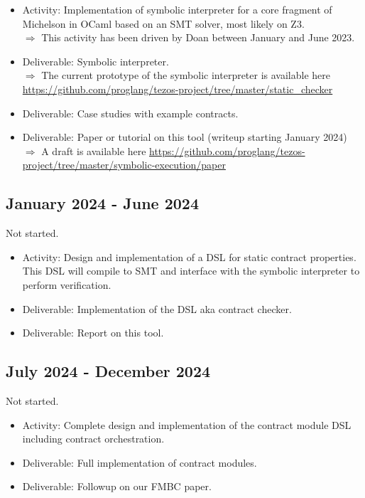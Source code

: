 \documentclass[a4paper,11pt]{article}
\begin{document}
\begin{itemize}
\item Activity: Implementation of symbolic interpreter for a core
  fragment of Michelson in OCaml based on an SMT solver, most likely
  on Z3. \\
  $\Rightarrow$ This activity has been driven by Doan between January and June
  2023. 
\item Deliverable: Symbolic interpreter. \\
  $\Rightarrow$ The current prototype of the symbolic interpreter is available here
  \url{https://github.com/proglang/tezos-project/tree/master/static_checker}
\item Deliverable: Case studies with example contracts.
\item Deliverable: Paper or tutorial on this tool (writeup starting
  January 2024) \\
  $\Rightarrow$ A draft is available here \url{https://github.com/proglang/tezos-project/tree/master/symbolic-execution/paper}
\end{itemize}

\subsection{January 2024 - June 2024}
\label{sec:january-2024-june}

Not started.

\begin{itemize}
\item Activity: Design and implementation of a DSL for static contract properties. This DSL will compile to SMT and interface with the symbolic interpreter to perform verification.  
\item Deliverable: Implementation of the DSL aka contract checker.
\item Deliverable: Report on this tool.
\end{itemize}

\subsection{July 2024 - December 2024}
\label{sec:july-2024-december}

Not started.

\begin{itemize}
\item Activity: Complete design and implementation of the contract module DSL including contract orchestration. 
\item Deliverable: Full implementation of contract modules.
\item Deliverable: Followup on our FMBC paper. 
\end{itemize}



\end{document}
